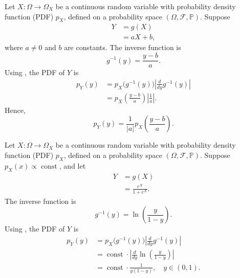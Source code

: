 \begin{example}
	Let $X\colon \Omega \to \Omega_X$ be a continuous random variable with probability density function (PDF) $p_X$, defined on a probability space $(\Omega, \mathcal{F}, \mathbb{P})$. Suppose 
	\begin{equation}
		\begin{split}
			Y &= g(X)\\ 
			&= aX + b,
		\end{split}
	\end{equation}
	where $a \neq 0$ and $b$ are constants. The inverse function is
	\begin{equation}
		g^{-1}(y) = \frac{y - b}{a}.
	\end{equation}
	Using , the PDF of $Y$ is
	\begin{equation}
		\begin{split}
			p_Y(y) &= p_X\bigl(g^{-1}(y)\bigr) \left| \frac{d}{dy} g^{-1}(y) \right| \\
			&= p_X\left(\frac{y - b}{a}\right) \left| \frac{1}{a} \right|.
		\end{split}
	\end{equation}
	Hence,
	\begin{equation}
		p_Y(y) = \frac{1}{|a|} p_X\left(\frac{y - b}{a}\right).
	\end{equation}
\end{example}

\begin{example}
	Let $X\colon \Omega \to \Omega_X$ be a continuous random variable with probability density function (PDF) $p_X$, defined on a probability space $(\Omega, \mathcal{F}, \mathbb{P})$. Suppose $p_X(x) \propto \operatorname{const}$, and let
	\begin{equation}
		\begin{split}
			Y &= g(X)\\
			& = \frac{e^X}{1 + e^X}.
		\end{split}
	\end{equation}
	The inverse function is
	\begin{equation}
		g^{-1}(y) = \ln\left(\frac{y}{1-y}\right).
	\end{equation}
	Using , the PDF of $Y$ is
	\begin{equation}
		\begin{split}
			p_Y(y) &= p_X\bigl(g^{-1}(y)\bigr) \left| \frac{d}{dy} g^{-1}(y) \right| \\
			&= \operatorname{const} \cdot \left| \frac{d}{dy} \ln\left(\frac{y}{1-y}\right) \right| \\
			&= \operatorname{const} \cdot \frac{1}{y(1-y)}, \quad y \in (0,1).
		\end{split}
	\end{equation}
\end{example}


